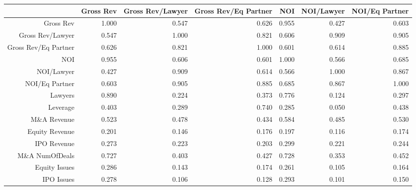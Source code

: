 \begin{table}[ht]
\centering
\begin{tabular}{rrrrrrr}
  \hline
 & Gross Rev & Gross Rev/Lawyer & Gross Rev/Eq Partner & NOI & NOI/Lawyer & NOI/Eq Partner \\ 
  \hline
Gross Rev & 1.000 & 0.547 & 0.626 & 0.955 & 0.427 & 0.603 \\ 
  Gross Rev/Lawyer & 0.547 & 1.000 & 0.821 & 0.606 & 0.909 & 0.905 \\ 
  Gross Rev/Eq Partner & 0.626 & 0.821 & 1.000 & 0.601 & 0.614 & 0.885 \\ 
  NOI & 0.955 & 0.606 & 0.601 & 1.000 & 0.566 & 0.685 \\ 
  NOI/Lawyer & 0.427 & 0.909 & 0.614 & 0.566 & 1.000 & 0.867 \\ 
  NOI/Eq Partner & 0.603 & 0.905 & 0.885 & 0.685 & 0.867 & 1.000 \\ 
  Lawyers & 0.890 & 0.224 & 0.373 & 0.776 & 0.124 & 0.297 \\ 
  Leverage & 0.403 & 0.289 & 0.740 & 0.285 & 0.050 & 0.438 \\ 
  M\&A Revenue & 0.523 & 0.478 & 0.434 & 0.584 & 0.485 & 0.530 \\ 
  Equity Revenue & 0.201 & 0.146 & 0.176 & 0.197 & 0.116 & 0.174 \\ 
  IPO Revenue & 0.273 & 0.223 & 0.203 & 0.299 & 0.221 & 0.244 \\ 
  M\&A NumOfDeals & 0.727 & 0.403 & 0.427 & 0.728 & 0.353 & 0.452 \\ 
  Equity Issues & 0.286 & 0.143 & 0.174 & 0.261 & 0.105 & 0.164 \\ 
  IPO Issues & 0.278 & 0.106 & 0.128 & 0.293 & 0.101 & 0.150 \\ 
   \hline
\end{tabular}
\end{table}
